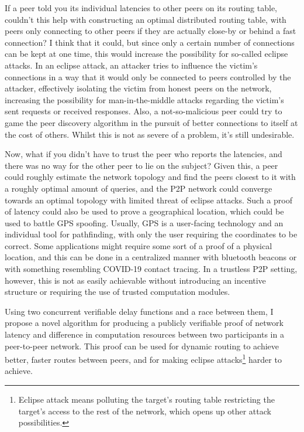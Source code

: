 If a peer told you its individual latencies to other peers on its routing table, couldn't this help with constructing an optimal distributed routing table, with peers only connecting to other peers if they are actually close-by or behind a fast connection? I think that it could, but since only a certain number of connections can be kept at one time, this would increase the possibility for so-called eclipse attacks. In an eclipse attack, an attacker tries to influence the victim's connections in a way that it would only be connected to peers controlled by the attacker, effectively isolating the victim from honest peers on the network, increasing the possibility for man-in-the-middle attacks regarding the victim's sent requests or received responses. Also, a not-so-malicious peer could try to game the peer discovery algorithm in the pursuit of better connections to itself at the cost of others. Whilst this is not as severe of a problem, it's still undesirable.

Now, what if you didn't have to trust the peer who reports the latencies, and there was no way for the other peer to lie on the subject? Given this, a peer could roughly estimate the network topology and find the peers closest to it with a roughly optimal amount of queries, and the P2P network could converge towards an optimal topology with limited threat of eclipse attacks. Such a proof of latency could also be used to prove a geographical location, which could be used to battle GPS spoofing. Usually, GPS is a user-facing technology and an individual tool for pathfinding, with only the user requiring the coordinates to be correct. Some applications might require some sort of a proof of a physical location, and this can be done in a centralized manner with bluetooth beacons or with something resembling COVID-19 contact tracing. In a trustless P2P setting, however, this is not as easily achievable without introducing an incentive structure or requiring the use of trusted computation modules.  

Using two concurrent verifiable delay functions and a race between them, I propose a novel algorithm for producing a publicly verifiable proof of network latency and difference in computation resources between two participants in a peer-to-peer network. This proof can be used for dynamic routing to achieve better, faster routes between peers, and for making eclipse attacks\footnote{Eclipse attack means polluting the target's routing table restricting the target's access to the rest of the network, which opens up other attack possibilities.} harder to achieve. 
